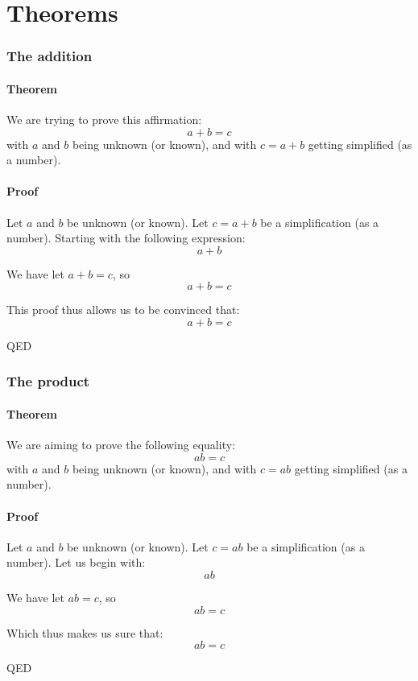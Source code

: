 \documentclass[a4paper]{article}
\let\oldpart\part
\newcommand{\parttitle}{}
\renewcommand{\part}[1]{\oldpart{#1}\renewcommand{\parttitle}{#1}}
\begin{document}
\part{Theorems}

\section{The addition\label{0}}
\subsection{Theorem}
We are trying to prove this affirmation:
\[a + b = c\]
with $a$ and $b$ being unknown (or known), and with $c=a+b$ getting simplified (as a number).\subsection{Proof}
Let $a$ and $b$ be unknown (or known). Let $c=a+b$ be a simplification (as a number). Starting with the following expression:
\[a+b\]

We have let $a+b=c$, so
\[a+b=c\]

This proof thus allows us to be convinced that:
\[a+b = c\]
\begin{flushright}
QED
\end{flushright}



\section{The product\label{1}}
\subsection{Theorem}
We are aiming to prove the following equality:
\[a  b = c\]
with $a$ and $b$ being unknown (or known), and with $c=ab$ getting simplified (as a number).\subsection{Proof}
Let $a$ and $b$ be unknown (or known). Let $c=ab$ be a simplification (as a number). Let us begin with:
\[ab\]

We have let $ab=c$, so
\[ab=c\]

Which thus makes us sure that:
\[ab = c\]
\begin{flushright}
QED
\end{flushright}
\end{document}
